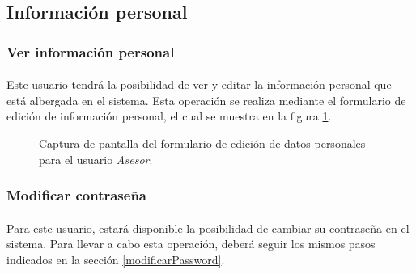 \subsection{Información personal}

  \subsubsection{Ver información personal}

  \paragraph{}Este usuario tendrá la posibilidad de ver y editar la información
  personal que está albergada en el sistema. Esta operación se realiza mediante
  el formulario de edición de información personal, el cual se muestra en la
  figura \ref{capturaModificarDatosAsesor}.

  \begin{figure}[!ht]
    \begin{center}
      \caption{Captura de pantalla del formulario de edición de datos personales para el usuario \textit{Asesor}.}
      \label{capturaModificarDatosAsesor}
    \end{center}
  \end{figure}


  \subsubsection{Modificar contraseña}

  \paragraph{}Para este usuario, estará disponible la posibilidad de cambiar su
  contraseña en el sistema. Para llevar a cabo esta operación, deberá seguir los
  mismos pasos indicados en la sección \ref{modificarPassword}.

